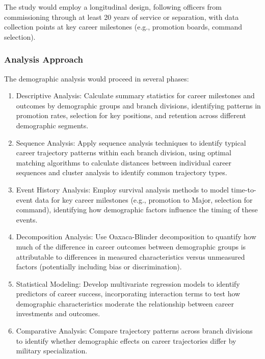 \documentclass[
  letterpaper,
  DIV=11,
  numbers=noendperiod]{scrartcl}
\begin{document}
The study would employ a longitudinal design, following officers from
commissioning through at least 20 years of service or separation, with
data collection points at key career milestones (e.g., promotion boards,
command selection).

\subsubsection{Analysis Approach}\label{analysis-approach}

The demographic analysis would proceed in several phases:

\begin{enumerate}
\def\labelenumi{\arabic{enumi}.}
\item
  Descriptive Analysis: Calculate summary statistics for career
  milestones and outcomes by demographic groups and branch divisions,
  identifying patterns in promotion rates, selection for key positions,
  and retention across different demographic segments.
\item
  Sequence Analysis: Apply sequence analysis techniques to identify
  typical career trajectory patterns within each branch division, using
  optimal matching algorithms to calculate distances between individual
  career sequences and cluster analysis to identify common trajectory
  types.
\item
  Event History Analysis: Employ survival analysis methods to model
  time-to-event data for key career milestones (e.g., promotion to
  Major, selection for command), identifying how demographic factors
  influence the timing of these events.
\item
  Decomposition Analysis: Use Oaxaca-Blinder decomposition to quantify
  how much of the difference in career outcomes between demographic
  groups is attributable to differences in measured characteristics
  versus unmeasured factors (potentially including bias or
  discrimination).
\item
  Statistical Modeling: Develop multivariate regression models to
  identify predictors of career success, incorporating interaction terms
  to test how demographic characteristics moderate the relationship
  between career investments and outcomes.
\item
  Comparative Analysis: Compare trajectory patterns across branch
  divisions to identify whether demographic effects on career
  trajectories differ by military specialization.
\end{enumerate}
\end{document}

